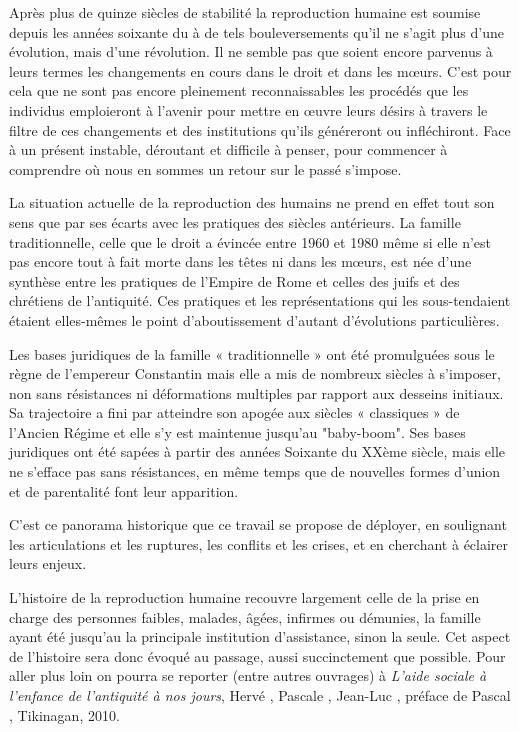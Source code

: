 Après plus de quinze siècles de stabilité la reproduction humaine
est soumise depuis les années soixante du  à de tels bouleversements
qu'il ne s'agit plus d'une évolution, mais d'une révolution. Il
ne semble pas que soient encore  parvenus à leurs termes les changements en
cours dans le droit et dans les mœurs. C'est pour cela que ne sont pas
encore pleinement reconnaissables les procédés que les individus emploieront
à l'avenir pour mettre en œuvre leurs désirs à travers le filtre
de ces changements et des institutions qu'ils généreront ou infléchiront.
Face à un présent instable, déroutant et difficile à penser, pour commencer à
comprendre où nous en sommes
 un retour sur le passé s'impose.

La situation actuelle de la reproduction des humains ne prend en
effet tout son sens que par ses écarts avec les pratiques des siècles antérieurs.
La famille traditionnelle, celle que le droit a évincée entre 1960 et
1980 même si elle n'est pas encore tout à fait morte dans les têtes ni dans les mœurs, est
née d'une synthèse entre les pratiques de l'Empire de Rome et celles des
juifs et des chrétiens de l'antiquité. Ces pratiques et les représentations
qui les sous-tendaient étaient elles-mêmes le point d'aboutissement
d'autant d'évolutions particulières.

Les bases juridiques de la famille « traditionnelle » ont été promulguées sous le règne
de l'empereur Constantin mais elle a mis de nombreux
siècles à s'imposer, non sans résistances ni déformations multiples par
rapport aux desseins initiaux. Sa trajectoire a fini par atteindre son apogée aux siècles « classiques »
de l'Ancien Régime et elle s'y est maintenue jusqu'au "baby-boom". Ses bases juridiques ont été sapées à partir des années Soixante du XXème siècle, mais elle ne s'efface pas sans résistances, en
même temps que de nouvelles formes d'union et de parentalité font leur
apparition.

C'est ce panorama historique que ce travail se propose de déployer, en soulignant les articulations et les ruptures, les
conflits et les crises, et en cherchant à éclairer leurs enjeux.

L'histoire de la reproduction humaine recouvre largement celle
de la prise en charge des personnes faibles, malades, âgées, infirmes ou
démunies, la famille ayant été jusqu'au  la principale institution
d'assistance, sinon la seule. Cet aspect de l'histoire sera donc évoqué
au passage, aussi succinctement que possible. Pour aller plus loin on
pourra se reporter (entre autres ouvrages) à \emph{L'aide sociale à l'enfance de l'antiquité à
nos jours},%
Hervé , Pascale , Jean-Luc ,
préface de Pascal , Tikinagan, 2010.

